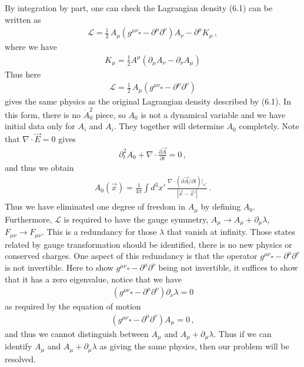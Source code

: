 \documentclass[11pt, onesided]{book}
\theoremstyle{break}
\theoremstyle{break}
\newcommand{\pd}{\partial}
\begin{document}
By integration by part, one can check the Lagrangian density (6.1) can be written as
\begin{align*}
\mathcal{L} = \frac{1}{2}\, A_\mu\left( g^{\mu\nu}\square - \pd^\mu \pd^\nu \right) A_\nu - \pd^\mu K_\mu\,,
\end{align*}
where we have
\begin{align*}
K_\mu = \frac{1}{2}A^\mu \left( \pd_\mu A_\nu - \pd_\nu A_\mu\right)
\end{align*}
Thus here
\begin{align*}
\mathcal{L} = \frac{1}{2}\, A_\mu\left( g^{\mu\nu}\square - \pd^\mu \pd^\nu \right)
\end{align*}
gives the same physics as the original Lagrangian density described by (6.1). In this form, there is no  $\dot{A}_0^2$ piece, so $A_0$ is not a dynamical variable and we have initial data only for $A_i$ and $\dot{A}_i$. They together will determine $A_0$ completely. Note that $\nabla \cdot \vec{E} = 0$ gives
\begin{align*}
\pd_t^2 A_0 + \nabla \cdot \frac{\pd \vec{A}}{\pd t} = 0\,,
\end{align*}
and thus we obtain
\begin{align}
A_0(\vec{x}) = \frac{1}{4\pi}\int d^3x'\, \frac{\nabla\cdot (\pd \vec{A}/\pd t)|_{x'}}{|\vec{x} - \vec{x}'|}\,.
\end{align}
Thus we have eliminated one degree of freedom in $A_\mu$ by defining $A_0$. Furthermore, $\mathcal{L}$ is required to have the gauge symmetry, $A_\mu \to A_\mu + \pd_\mu \lambda$, $F_{\mu\nu}\to F_{\mu\nu}$. This is a redundancy for those $\lambda$ that vanish at infinity. Those states related by gauge transformation should be identified, there is no new physics or conserved charges.  One aspect of this redundancy is that the operator $g^{\mu\nu}\square - \pd^\mu \pd^\nu$ is not invertible. Here to show $g^{\mu\nu}\square - \pd^\mu \pd^\nu$ being not invertible, it suffices to show that it has a zero eigenvalue, notice that we have
\begin{align*}
(g^{\mu\nu}\square - \pd^\mu \pd^\nu) \pd_\nu \lambda = 0
\end{align*}
as required by the equation of motion
\begin{align*}
(g^{\mu\nu}\square - \pd^\mu \pd^\nu) A_\mu = 0\,,
\end{align*}
and thus we cannot distinguish between $A_\mu$ and $A_\mu + \pd_\mu \lambda$. Thus if we can identify $A_\mu$ and $A_\mu + \pd_\mu \lambda$ as giving the same physics, then our problem will be resolved. \\
\end{document}
